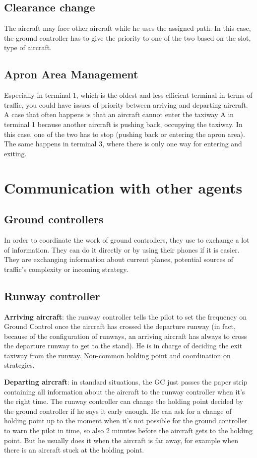 \documentclass{article}
\begin{document}
\subsection{Clearance change}
The aircraft may face other aircraft while he uses the assigned path. In this case, the ground controller has to give the priority to one of the two based on the slot, type of aircraft.

\subsection{Apron Area Management}
Especially in terminal 1, which is the oldest and less efficient terminal in terms of traffic, you could have issues of priority between arriving and departing aircraft. A case that often happens is that an aircraft cannot enter the taxiway A in terminal 1 because another aircraft is pushing back, occupying the taxiway. In this case, one of the two has to stop (pushing back or entering the apron area). The same happens in terminal 3, where there is only one way for entering and exiting. 

\section{Communication with other agents}
\subsection{Ground controllers}
In order to coordinate the work of ground controllers, they use to exchange a lot of information. They can do it directly or by using their phones if it is easier. They are exchanging information about current planes, potential sources of traffic's complexity or incoming strategy.

\subsection{Runway controller}
\textbf{Arriving aircraft}: the runway controller tells the pilot to set the frequency on Ground Control once the aircraft has crossed the departure runway (in fact, because of the configuration of runways, an arriving aircraft has always to cross the departure runway to get to the stand). 
He is in charge of deciding the exit taxiway from the runway.
Non-common holding point and coordination on strategies.

\textbf{Departing aircraft}: in standard situations, the GC just passes the paper strip containing all information about the aircraft to the runway controller when it's the right time.
The runway controller can change the holding point decided by the ground controller if he says it early enough. He can ask for a change of holding point up to the moment when it's not possible for the ground controller to warn the pilot in time, so also 2 minutes before the aircraft gets to the holding point. But he usually does it when the aircraft is far away, for example when there is an aircraft stuck at the holding point.
\end{document}
